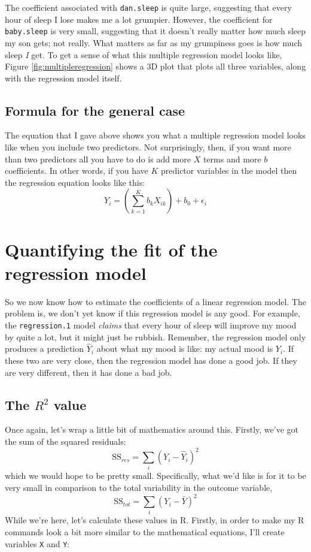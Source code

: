 \documentclass[
]{book}
\begin{document}
The coefficient associated with \texttt{dan.sleep} is quite large, suggesting that every hour of sleep I lose makes me a lot grumpier. However, the coefficient for \texttt{baby.sleep} is very small, suggesting that it doesn't really matter how much sleep my son gets; not really. What matters as far as my grumpiness goes is how much sleep \emph{I} get. To get a sense of what this multiple regression model looks like, Figure \ref{fig:multipleregression} shows a 3D plot that plots all three variables, along with the regression model itself.

\hypertarget{formula-for-the-general-case}{%
\subsection{Formula for the general case}\label{formula-for-the-general-case}}

The equation that I gave above shows you what a multiple regression model looks like when you include two predictors. Not surprisingly, then, if you want more than two predictors all you have to do is add more \(X\) terms and more \(b\) coefficients. In other words, if you have \(K\) predictor variables in the model then the regression equation looks like this:
\[
Y_i = \left( \sum_{k=1}^K b_{k} X_{ik} \right) + b_0 + \epsilon_i
\]

\hypertarget{r2}{%
\section{Quantifying the fit of the regression model}\label{r2}}

So we now know how to estimate the coefficients of a linear regression model. The problem is, we don't yet know if this regression model is any good. For example, the \texttt{regression.1} model \emph{claims} that every hour of sleep will improve my mood by quite a lot, but it might just be rubbish. Remember, the regression model only produces a prediction \(\hat{Y}_i\) about what my mood is like: my actual mood is \(Y_i\). If these two are very close, then the regression model has done a good job. If they are very different, then it has done a bad job.

\hypertarget{the-r2-value}{%
\subsection{\texorpdfstring{The \(R^2\) value}{The R\^{}2 value}}\label{the-r2-value}}

Once again, let's wrap a little bit of mathematics around this. Firstly, we've got the sum of the squared residuals:
\[
\mbox{SS}_{res} = \sum_i (Y_i - \hat{Y}_i)^2
\]
which we would hope to be pretty small. Specifically, what we'd like is for it to be very small in comparison to the total variability in the outcome variable,
\[
\mbox{SS}_{tot} = \sum_i (Y_i - \bar{Y})^2
\]
While we're here, let's calculate these values in R. Firstly, in order to make my R commands look a bit more similar to the mathematical equations, I'll create variables \texttt{X} and \texttt{Y}:
\end{document}
